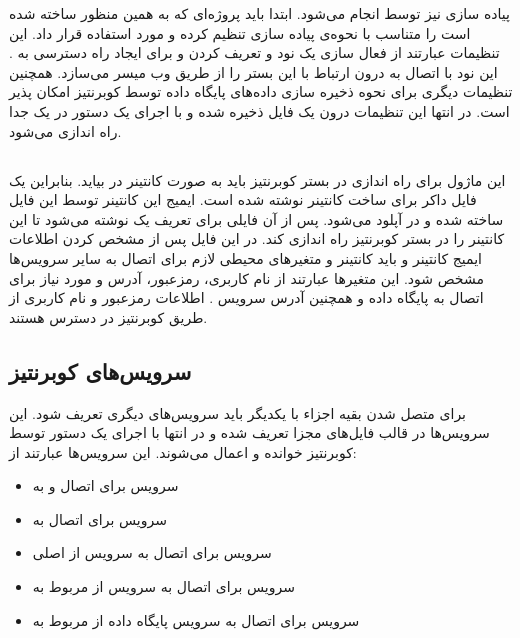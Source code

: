پیاده سازی  نیز توسط  انجام می‌شود. ابتدا باید پروژه‌ای که به همین منظور ساخته شده است را متناسب با نحوه‌ی پیاده سازی تنظیم کرده و مورد استفاده قرار داد. این تنظیمات عبارتند از فعال سازی یک نود  و تعریف کردن  و  برای ایجاد راه دسترسی به . این نود با اتصال به   درون  ارتباط با این بستر را از طریق وب میسر می‌سازد. همچنین تنظیمات دیگری برای نحوه ذخیره سازی داده‌های پایگاه داده  توسط کوبرنتیز امکان پذیر است. در انتها این تنظیمات درون یک فایل ذخیره شده و  با اجرای یک دستور  در یک  جدا راه اندازی می‌شود.

\subsection{}

این ماژول برای راه اندازی در بستر کوبرنتیز باید به صورت کانتینر در بیاید. بنابراین یک فایل داکر  برای ساخت کانتینر نوشته شده است. ایمیج این کانتینر توسط این فایل ساخته شده و  در  آپلود می‌شود. پس از آن فایلی برای تعریف یک  نوشته می‌شود تا این کانتینر را در بستر کوبرنتیز راه اندازی کند. در این فایل پس از مشخص کردن اطلاعات ایمیج کانتینر و  باید  کانتینر و متغیرهای محیطی لازم برای اتصال به سایر سرویس‌ها مشخص شود. این متغیرها عبارتند از نام کاربری، رمزعبور، آدرس و  مورد نیاز برای اتصال به پایگاه داده  و همچنین آدرس سرویس . اطلاعات رمزعبور و نام کاربری از طریق  کوبرنتیز در دسترس هستند.

\subsection{سرویس‌های کوبرنتیز}

برای متصل شدن بقیه اجزاء با یکدیگر باید سرویس‌های دیگری تعریف شود. این سرویس‌ها در قالب فایل‌های مجزا تعریف شده و در انتها با اجرای یک دستور  توسط کوبرنتیز خوانده و اعمال می‌شوند. این سرویس‌ها عبارتند از:

\begin{itemize}

	\item سرویس  برای اتصال  و  به 
	
	\item سرویس  برای اتصال به 
	
	\item سرویس  برای اتصال به سرویس  از  اصلی
	
	\item سرویس  برای اتصال به سرویس  از  مربوط به 
	
	\item سرویس  برای اتصال به سرویس پایگاه داده  از  مربوط به 

\end{itemize}

